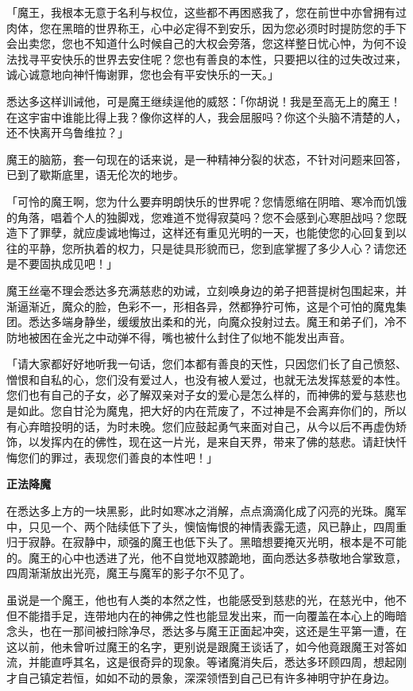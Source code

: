 \documentclass[twoside,openany]{book}
\newcommand{\mt}[1]{\textbullet \textbf{#1}}
\begin{document}
「魔王，我根本无意于名利与权位，这些都不再困惑我了，您在前世中亦曾拥有过肉体，您在黑暗的世界称王，心中必定得不到安乐，因为您必须时时提防您的手下会出卖您，您也不知道什么时候自己的大权会旁落，您这样整日忧心忡，为何不设法找寻平安快乐的世界去安住呢？您也有善良的本性，只要把以往的过失改过来，诚心诚意地向神忏悔谢罪，您也会有平安快乐的一天。」

悉达多这样训诫他，可是魔王继续逞他的威怒：「你胡说！我是至高无上的魔王！在这宇宙中谁能比得上我？像你这样的人，我会屈服吗？你这个头脑不清楚的人，还不快离开乌鲁维拉？」

魔王的脑筋，套一句现在的话来说，是一种精神分裂的状态，不针对问题来回答，已到了歇斯底里，语无伦次的地步。

「可怜的魔王啊，您为什么要弃明朗快乐的世界呢？您情愿缩在阴暗、寒冷而饥饿的角落，唱着个人的独脚戏，您难道不觉得寂莫吗？您不会感到心寒胆战吗？您既造下了罪孽，就应虔诚地悔过，这样还有重见光明的一天，也能使您的心回复到以往的平静，您所执着的权力，只是徒具形貌而已，您到底掌握了多少人心？请您还是不要固执成见吧！」

魔王丝毫不理会悉达多充满慈悲的劝诫，立刻唤身边的弟子把菩提树包围起来，并渐逼渐近，魔众的脸，色彩不一，形相各异，然都狰狞可怖，这是个可怕的魔鬼集团。悉达多端身静坐，缓缓放出柔和的光，向魔众投射过去。魔王和弟子们，冷不防地被困在金光之中动弹不得，嘴也被什么封住了似地不能发出声音。

「请大家都好好地听我一句话，您们本都有善良的天性，只因您们长了自己愤怒、憎恨和自私的心，您们没有爱过人，也没有被人爱过，也就无法发挥慈爱的本性。您们也有自己的子女，必了解双亲对子女的爱心是怎么样的，而神佛的爱与慈悲也是如此。您自甘沦为魔鬼，把大好的内在荒废了，不过神是不会离弃你们的，所以有心弃暗投明的话，为时未晚。您们应鼓起勇气来面对自己，从今以后不再虚伪矫饰，以发挥内在的佛性，现在这一片光，是来自天界，带来了佛的慈悲。请赶快忏悔您们的罪过，表现您们善良的本性吧！」

\mt{正法降魔}

在悉达多上方的一块黑影，此时如寒冰之消解，点点滴滴化成了闪亮的光珠。魔军中，只见一个、两个陆续低下了头，懊恼悔恨的神情表露无遗，风已静止，四周重归于寂静。在寂静中，顽强的魔王也低下头了。黑暗想要掩灭光明，根本是不可能的。魔王的心中也透进了光，他不自觉地双膝跪地，面向悉达多恭敬地合掌致意，四周渐渐放出光亮，魔王与魔军的影子尔不见了。

虽说是一个魔王，他也有人类的本然之性，也能感受到慈悲的光，在慈光中，他不但不能措手足，连带地内在的神佛之性也能显发出来，而一向覆盖在本心上的晦暗念头，也在一那间被扫除净尽，悉达多与魔王正面起冲突，这还是生平第一遭，在这以前，他未曾听过魔王的名字，更别说是跟魔王谈话了，如今他竟跟魔王对答如流，并能直呼其名，这是很奇异的现象。等诸魔消失后，悉达多环顾四周，想起刚才自己镇定若恒，如如不动的景象，深深领悟到自己已有许多神明守护在身边。
\end{document}
